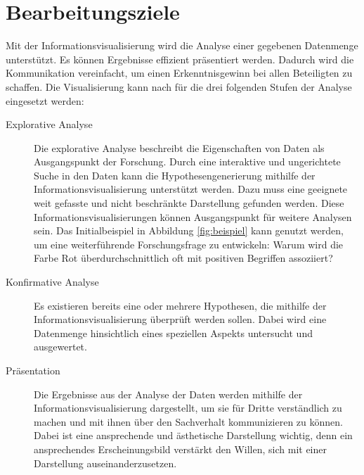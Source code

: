 \documentclass[a4paper, 
               12pt,
               DIV=calc,
               version=first,
               pdftex,
               headsepline,
               footsepline,
               bibliography=totocnumbered,
               listof=numbered]{scrreprt}
\begin{document}
\section{Bearbeitungsziele}
\label{sec:Ziele}
Mit der Informationsvisualisierung wird die Analyse einer gegebenen Datenmenge unterstützt.
Es können Ergebnisse effizient präsentiert werden. Dadurch wird die Kommunikation vereinfacht,
um einen Erkenntnisgewinn bei allen Beteiligten zu schaffen.
Die Visualisierung kann nach \cite{Schumann} für die drei folgenden Stufen der Analyse eingesetzt werden:
\begin{description}
\item[Explorative Analyse]
Die explorative Analyse beschreibt die Eigenschaften von Daten als Ausgangspunkt der Forschung.
Durch eine interaktive und ungerichtete Suche in den Daten
kann die Hypothesengenerierung mithilfe der Informationsvisualisierung unterstützt werden. Dazu muss eine
geeignete weit gefasste und nicht beschränkte Darstellung gefunden werden. Diese Informationsvisualisierungen
können Ausgangspunkt für weitere Analysen sein. Das Initialbeispiel in Abbildung \ref{fig:beispiel} kann
genutzt werden, um eine weiterführende Forschungsfrage zu entwickeln: Warum wird die Farbe Rot überdurchschnittlich
oft mit positiven Begriffen assoziiert?
\item[Konfirmative Analyse]
Es existieren bereits eine oder mehrere Hypothesen, die mithilfe der Informationsvisualisierung überprüft werden sollen.
Dabei wird eine Datenmenge hinsichtlich eines speziellen Aspekts untersucht und ausgewertet.
\item[Präsentation]
Die Ergebnisse aus der Analyse der Daten werden mithilfe der Informationsvisualisierung dargestellt, um sie für Dritte verständlich
zu machen und mit ihnen über den Sachverhalt kommunizieren zu können.
Dabei ist eine ansprechende und ästhetische Darstellung wichtig, denn
ein ansprechendes Erscheinungsbild verstärkt den Willen, sich mit einer Darstellung auseinanderzusetzen.
\end{description}
\end{document}
